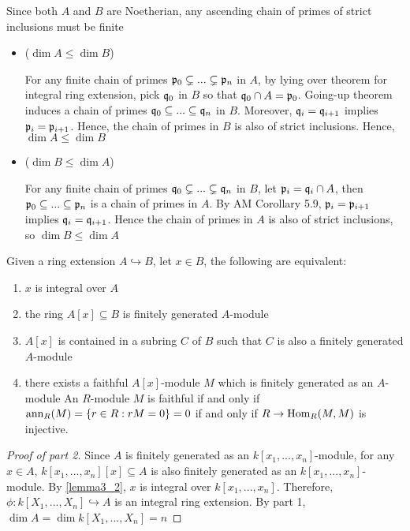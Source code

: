 \begin{longproof}
	Since both $A$ and $B$ are Noetherian, any ascending chain of primes of strict inclusions must be finite
	\begin{itemize}
		\item ($\dim A \leq \dim B$)
		
		For any finite chain of primes $\mathfrak{p}_0 \subsetneq ... \subsetneq \mathfrak{p}_n$ in $A$, by lying over theorem for integral ring extension, pick $\mathfrak{q}_0$ in $B$ so that $\mathfrak{q}_0 \cap A = \mathfrak{p}_0$. Going-up theorem induces a chain of primes $\mathfrak{q}_0 \subseteq ... \subseteq \mathfrak{q}_n$ in $B$. Moreover, $\mathfrak{q}_i = \mathfrak{q}_{i+1}$ implies $\mathfrak{p}_i = \mathfrak{p}_{i+1}$. Hence, the chain of primes in $B$ is also of strict inclusions. Hence, $\dim A \leq \dim B$
		
		\item ($\dim B \leq \dim A$)
		
		For any finite chain of primes $\mathfrak{q}_0 \subsetneq ... \subsetneq \mathfrak{q}_n$ in $B$, let $\mathfrak{p}_i = \mathfrak{q}_i \cap A$, then $\mathfrak{p}_0 \subseteq ... \subseteq \mathfrak{p}_n$ is a chain of primes in $A$. By AM Corollary 5.9, $\mathfrak{p}_i = \mathfrak{p}_{i+1}$ implies $\mathfrak{q}_i = \mathfrak{q}_{i+1}$. Hence the chain of primes in $A$ is also of strict inclusions, so $\dim B \leq \dim A$
	\end{itemize}
\end{longproof}

\begin{lemma}
	Given a ring extension $A \hookrightarrow B$, let $x \in B$, the following are equivalent:
	\begin{enumerate}
		\item $x$ is integral over $A$
		
		\item \label{lemma3_2} the ring $A[x] \subseteq B$ is finitely generated $A$-module
		
		\item $A[x]$ is contained in a subring $C$ of $B$ such that $C$ is also a finitely generated $A$-module
		
		\item there exists a faithful $A[x]$-module $M$ which is finitely generated as an $A$-module
		An $R$-module $M$ is faithful if and only if $\operatorname{ann}_R(M) = \{r \in R: rM = 0\} = 0$ if and only if $R \to \operatorname{Hom}_R(M, M)$ is injective.
	\end{enumerate}
\end{lemma}

\begin{proof}[Proof of part 2]
	Since $A$ is finitely generated as an $k[x_1, ..., x_n]$-module, for any $x \in A$, $k[x_1, ..., x_n][x] \subseteq A$ is also finitely generated as an $k[x_1, ..., x_n]$-module. By \ref{lemma3_2}, $x$ is integral over $k[x_1, ..., x_n]$. Therefore, $\phi: k[X_1, ..., X_n] \hookrightarrow A$ is an integral ring extension. By part 1, $\dim A = \dim k[X_1, ..., X_n] = n$
\end{proof}


